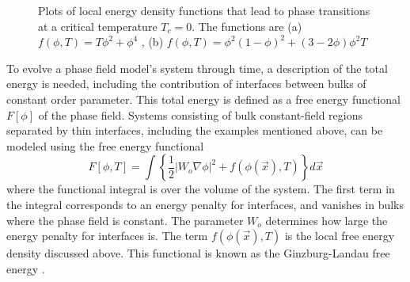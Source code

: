 \begin{figure}[h]
    \centering
{}
    \caption{Plots of local energy density functions that lead to phase transitions at a critical temperature $T_c = 0$. The functions are (a) $f(\phi,T)=T\phi^2+\phi^4$ , (b) $f(\phi,T)=\phi^2(1-\phi)^2 + (3-2\phi)\phi^2T$}\label{fig:landau_functions}
\end{figure}



To evolve a phase field model's system through time, a description of the total energy is needed, including the contribution of interfaces between bulks of constant order parameter. This total energy is defined as a free energy functional $F[\phi]$ of the phase field. Systems consisting of bulk constant-field regions separated by thin interfaces, including the examples mentioned above, can be modeled using the free energy functional
\begin{equation}\label{eq:ginzlandau}
F[\phi,T] = \int \left\{ \frac{1}{2} | W_o \nabla\phi |^2 + f(\phi(\vec{x}),T)  \right\}d\vec{x}
\end{equation}
where the functional integral is over the volume of the system. The first term in the integral corresponds to an energy penalty for interfaces, and vanishes in bulks where the phase field is constant. The parameter $W_o$ determines how large the energy penalty for interfaces is. The term $f(\phi(\vec{x}),T)$ is the local free energy density discussed above. This functional is known as the Ginzburg-Landau free energy \cite{huang_statmech}.

